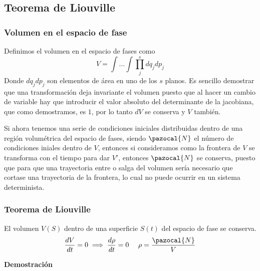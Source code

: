 \vspace{-35pt}

\subsection{Teorema de Liouville} 
\subsubsection{Volumen en el espacio de fase}
Definimos el volumen en el espacio de fases como
\begin{equation} \label{4.3.1}
    V = \int \dots \int \prod_j^s d q_j d p_j
\end{equation} 
Donde $d q_j d p_j$ son elementos de área en uno de los $s$ planos. Es sencillo demostrar que una transformación deja invariante el volumen puesto que al hacer un cambio de variable hay que introducir el valor absoluto del determinante de la jacobiana, que como demostramos, es $1$, por lo tanto $dV$ se conserva y $V$ también.

Si ahora tenemos una serie de condiciones iniciales distribuidas dentro de una región volumétrica del espacio de fases, siendo $\pazocal{N}$ el número de condiciones iniales dentro de $V$, entonces si consideramos como la frontera de $V$ se transforma con el tiempo para dar $V'$, entonces $\pazocal{N}$ se conserva, puesto que para que una trayectoria entre o salga del volumen sería necesario que cortase una trayectoria de la frontera, lo cual no puede ocurrir en un sistema determinista.
\subsubsection{Teorema de Liouville} 
El volumen $V(S)$ dentro de una superficie $S(t)$ del espacio de fase se conserva.
\begin{equation} \label{4.3.2}
    \frac{dV}{dt}=0 \implies \frac{d\rho}{dt} = 0 \ \ \ \ \rho = \frac{\pazocal{N}}{V}
\end{equation} 

\textbf{Demostración}

